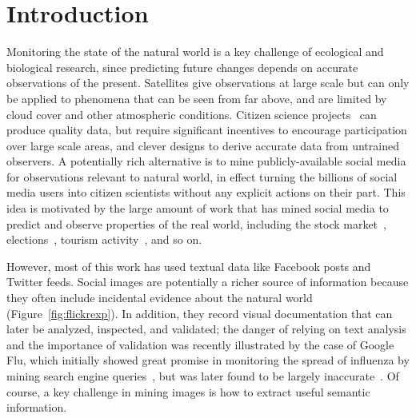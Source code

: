 \section{Introduction}

Monitoring the state of the natural world is a key challenge of
ecological and biological research, since predicting future changes
depends on accurate observations of the present. Satellites give
observations at large scale but can only be applied to phenomena that
can be seen from far above, and are limited by cloud cover and other
atmospheric conditions.  Citizen science projects~\cite{citizensci,lostladybug} can
produce quality data, but require significant incentives to encourage
participation over large scale areas, and clever designs to derive
accurate data from untrained observers.  A potentially rich
alternative is to mine publicly-available social media for
observations relevant to natural world, in effect turning the billions
of social media users into citizen scientists without any explicit
actions on their part.  This idea is motivated by the large amount of
work that has  mined social media  to predict and
observe properties of the real world, including the stock
market~\cite{bollen11twitter},
elections~\cite{you2015multifacetedelections}, tourism
activity~\cite{wood2013usingtourism}, and so on.

However, most of this work has used textual data like Facebook posts
and Twitter feeds.  Social images are potentially a richer source of
information because they often include incidental evidence about the
natural world (Figure~\ref{fig:flickrexp}).  In addition, they record
visual documentation that can later be analyzed, inspected, and
validated; the danger of relying on text analysis and the importance
of validation was recently illustrated by the case of Google
Flu, which initially showed great promise in monitoring the spread of
influenza by mining search engine queries~\cite{ginsberg09flu}, but
was later found to be largely inaccurate~\cite{lazer2014parable}.
Of course, a key challenge in mining images is how to extract useful
semantic information.

